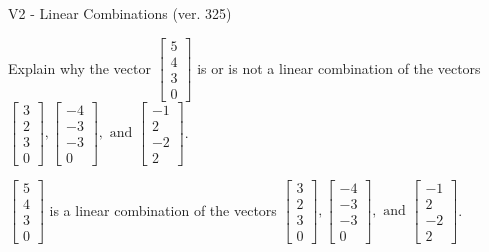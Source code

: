 \begin{exercise}
  \begin{exerciseTitle}V2 - Linear Combinations (ver. 325)\end{exerciseTitle}
  \begin{exerciseStatement}
    Explain why the vector \(\left[\begin{array}{c}
5 \\
4 \\
3 \\
0
\end{array}\right]\)  is or is not a linear 
	combination of the vectors \(\left[\begin{array}{c}
3 \\
2 \\
3 \\
0
\end{array}\right] , \left[\begin{array}{c}
-4 \\
-3 \\
-3 \\
0
\end{array}\right] , \text{ and } \left[\begin{array}{c}
-1 \\
2 \\
-2 \\
2
\end{array}\right]\).
	


  \end{exerciseStatement}
  \begin{exerciseAnswer}
   \(\left[\begin{array}{c}
5 \\
4 \\
3 \\
0
\end{array}\right]\) 
  	 is  
	a linear combination of the vectors \(\left[\begin{array}{c}
3 \\
2 \\
3 \\
0
\end{array}\right] , \left[\begin{array}{c}
-4 \\
-3 \\
-3 \\
0
\end{array}\right] , \text{ and } \left[\begin{array}{c}
-1 \\
2 \\
-2 \\
2
\end{array}\right]\).

	
  


  \end{exerciseAnswer}
\end{exercise}